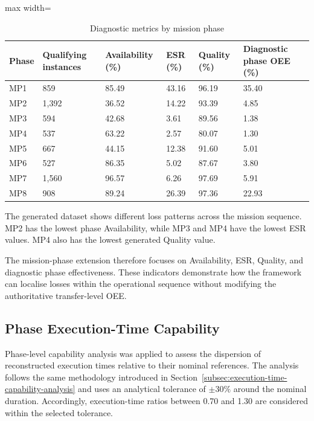 \begin{table}[htbp]
\small
\renewcommand{\arraystretch}{1.3}
\centering
\caption{Diagnostic metrics by mission phase}
\label{tab:diagnostic-metrics-by-mission-phase}
\begin{adjustbox}{max width=\textwidth}
\begin{tabular}{|p{1.0cm}|p{2.7cm}|p{2.2cm}|p{1.7cm}|p{1.7cm}|p{2.0cm}|}
\hline
\textbf{Phase} & \textbf{Qualifying instances} & \textbf{Availability (\%)} & \textbf{ESR (\%)} & \textbf{Quality (\%)} & \textbf{Diagnostic phase OEE (\%)} \\
\hline
MP1 & 859 & 85.49 & 43.16 & 96.19 & 35.40 \\
\hline
MP2 & 1,392 & 36.52 & 14.22 & 93.39 & 4.85 \\
\hline
MP3 & 594 & 42.68 & 3.61 & 89.56 & 1.38 \\
\hline
MP4 & 537 & 63.22 & 2.57 & 80.07 & 1.30 \\
\hline
MP5 & 667 & 44.15 & 12.38 & 91.60 & 5.01 \\
\hline
MP6 & 527 & 86.35 & 5.02 & 87.67 & 3.80 \\
\hline
MP7 & 1,560 & 96.57 & 6.26 & 97.69 & 5.91 \\
\hline
MP8 & 908 & 89.24 & 26.39 & 97.36 & 22.93 \\
\hline
\end{tabular}
\end{adjustbox}
\end{table}

The generated dataset shows different loss patterns across the mission sequence. MP2 has the lowest phase Availability, while MP3 and MP4 have the lowest ESR values. MP4 also has the lowest generated Quality value.

The mission-phase extension therefore focuses on Availability, ESR, Quality, and diagnostic phase effectiveness. These indicators demonstrate how the framework can localise losses within the operational sequence without modifying the authoritative transfer-level OEE.

\subsection{Phase Execution-Time Capability}
\label{subsec:phase-execution-time-capability}
Phase-level capability analysis was applied to assess the dispersion of reconstructed execution times relative to their nominal references. The analysis follows the same methodology introduced in Section~\ref{subsec:execution-time-capability-analysis} and uses an analytical tolerance of $\pm 30\%$ around the nominal duration. Accordingly, execution-time ratios between 0.70 and 1.30 are considered within the selected tolerance.

